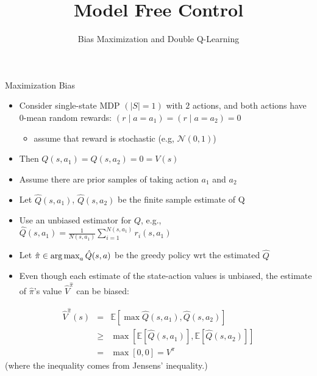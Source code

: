 \documentclass[aspectratio=169]{../latex_main/tntbeamer}  %
\title[RL: Model Free Control]{Model Free Control}
\subtitle{Bias Maximization and Double Q-Learning}
\begin{document}
	
	\maketitle

\begin{frame}[c]{Maximization Bias}
	
	\begin{itemize}
		\item Consider single-state MDP $(|S| = 1)$ with $2$ actions, and both actions have 0-mean random rewards: $(r \mid a = a_1 ) = (r \mid a = a_2) = 0$
		\begin{itemize}
				\item assume that reward is stochastic (e.g, $\mathcal{N}(0,1)$)
		\end{itemize}
		\item Then $Q(s,a_1) = Q(s,a_2) = 0 = V(s)$
		\item Assume there are prior samples of taking action $a_1$ and $a_2$
		\pause
		\item Let $\hat{Q}(s,a_1)$, $\hat{Q}(s,a_2)$ be the \alert{finite} sample estimate of Q
		\item Use an unbiased estimator for $Q$, e.g., $\hat{Q}(s,a_1) = \frac{1}{N(s,a_1)} \sum_{i=1}^{N(s,a_1)} r_i(s,a_1)$
		\pause
		\item Let $\hat{\pi}\in \operatorname*{arg\,max}_{a}\hat{Q}(s,a)$ be the greedy policy wrt the estimated $\hat{Q}$
		\pause
		\item Even though each estimate of the state-action values is unbiased, the estimate of $\hat{\pi}$'s value $\hat{V}^{\hat{\pi}}$ can be biased:
	\end{itemize}

\vspace{-1em}
\begin{eqnarray}
\hat{V}^{\hat{\pi}}(s) &=& \mathbb{E} [\max \hat{Q}(s,a_1), \hat{Q}(s,a_2)]\nonumber\\
&\geq& \max [\mathbb{E}[\hat{Q}(s,a_1)],\mathbb{E}[\hat{Q}(s,a_2)]]\nonumber\\
&=& \max[0,0] = V^\pi\nonumber
\end{eqnarray}
(where the inequality comes from Jensens' inequality.)
	
\end{frame}
\end{document}
